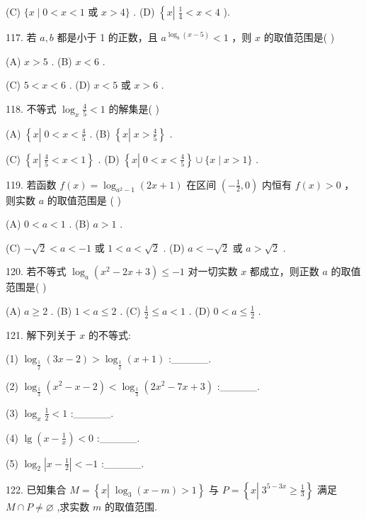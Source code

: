 \documentclass[10pt]{article}
\begin{document}
(C) \(\{ x \mid  0 < x < 1\) 或 \(x > 4\}\) . (D) \(\left\{  {x\left| {\;\frac{1}{4} < x < 4}\right. }\right.\) ).

117. 若 \(a,b\) 都是小于 1 的正数，且 \({a}^{{\log }_{b}\left( {x - 5}\right) } < 1\) ，则 \(x\) 的取值范围是( )

(A) \(x > 5\) . (B) \(x < 6\) .

(C) \(5 < x < 6\) . (D) \(x < 5\) 或 \(x > 6\) .

118. 不等式 \({\log }_{x}\frac{4}{5} < 1\) 的解集是( )

(A) \(\left\{  {x\left| {\;0 < x < \frac{4}{5}}\right. }\right.\) . (B) \(\left\{  {x\left| {\;x > \frac{4}{5}}\right. }\right\}\) .

(C) \(\left\{  {x\left| {\;\frac{4}{5} < x < 1}\right. }\right\}\) . (D) \(\left\{  {x\left| {\;0 < x < \frac{4}{5}}\right. }\right\}   \cup  \{ x \mid  x > 1\}\) .

119. 若函数 \(f\left( x\right)  = {\log }_{{a}^{2} - 1}\left( {{2x} + 1}\right)\) 在区间 \(\left( {-\frac{1}{2},0}\right)\) 内恒有 \(f\left( x\right)  > 0\) ，则实数 \(a\) 的取值范围是 ( )

(A) \(0 < a < 1\) . (B) \(a > 1\) .

(C) \(- \sqrt{2} < a <  - 1\) 或 \(1 < a < \sqrt{2}\) . (D) \(a <  - \sqrt{2}\) 或 \(a > \sqrt{2}\) .

120. 若不等式 \({\log }_{a}\left( {{x}^{2} - {2x} + 3}\right)  \leq   - 1\) 对一切实数 \(x\) 都成立，则正数 \(a\) 的取值范围是( )

(A) \(a \geq  2\) . (B) \(1 < a \leq  2\) . (C) \(\frac{1}{2} \leq  a < 1\) . (D) \(0 < a \leq  \frac{1}{2}\) .

121. 解下列关于 \(x\) 的不等式:

(1) \({\log }_{\frac{1}{2}}\left( {{3x} - 2}\right)  > {\log }_{\frac{1}{2}}\left( {x + 1}\right)\) :\_\_\_\_\_.

(2) \({\log }_{\frac{1}{3}}\left( {{x}^{2} - x - 2}\right)  < {\log }_{\frac{1}{3}}\left( {2{x}^{2} - {7x} + 3}\right)\) :\_\_\_\_\_.

(3) \({\log }_{x}\frac{1}{2} < 1\) :\_\_\_\_\_.

(4) \(\lg \left( {x - \frac{1}{x}}\right)  < 0\) :\_\_\_\_\_.

(5) \({\log }_{2}\left| {x - \frac{1}{2}}\right|  <  - 1\) :\_\_\_\_\_.

122. 已知集合 \(M = \left\{  {x\left| {\;{\log }_{3}\left( {x - m}\right)  > 1}\right. }\right\}\) 与 \(P = \left\{  {x\left| {\;{3}^{5 - {3x}} \geq  \frac{1}{3}}\right. }\right\}\) 满足 \(M \cap  P \neq  \varnothing\) ,求实数 \(m\) 的取值范围.
\end{document}
